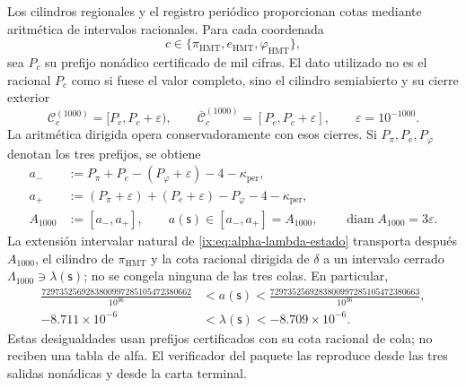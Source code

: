 Los cilindros regionales y el registro periódico proporcionan cotas mediante
aritmética de intervalos racionales. Para cada coordenada
\[
 c\in\{\pi_{\mathrm{HMT}},e_{\mathrm{HMT}},\varphi_{\mathrm{HMT}}\},
\]
sea \(P_c\) su prefijo nonádico certificado de mil cifras. El dato utilizado
no es el racional \(P_c\) como si fuese el valor completo, sino el cilindro
semiabierto y su cierre exterior
\[
 \mathcal C_c^{(1000)}=[P_c,P_c+\varepsilon),
 \qquad
 \overline{\mathcal C}_c^{(1000)}=[P_c,P_c+\varepsilon],
 \qquad \varepsilon=10^{-1000}.
\]
La aritmética dirigida opera conservadoramente con esos cierres. Si
\(P_\pi,P_e,P_\varphi\) denotan los tres prefijos, se obtiene
\begin{equation}
\begin{aligned}
 a_-&:=P_\pi+P_e-(P_\varphi+\varepsilon)-4-
       \kappa_{\mathrm{per}},\\
 a_+&:=(P_\pi+\varepsilon)+(P_e+\varepsilon)-P_\varphi-4-
       \kappa_{\mathrm{per}},\\
 A_{1000}&:=[a_-,a_+],
 \qquad a(\mathsf s)\in[a_-,a_+]=A_{1000},
 \qquad \operatorname{diam}A_{1000}=3\varepsilon.
\end{aligned}
\label{ix:eq:alpha-propagacion-colas-rev08}
\end{equation}
La extensión intervalar natural de
\eqref{ix:eq:alpha-lambda-estado} transporta después \(A_{1000}\), el cilindro
de \(\pi_{\mathrm{HMT}}\) y la cota racional dirigida de \(\delta\) a un
intervalo cerrado \(\Lambda_{1000}\ni\lambda(\mathsf s)\); no se congela
ninguna de las tres colas. En particular,
\begin{equation}
\begin{aligned}
 \frac{7297352569283800997285105472380662}{10^{36}}
 &<a(\mathsf s)<
 \frac{7297352569283800997285105472380663}{10^{36}},\\
 -8.711\mathbin{\times}10^{-6}
 &<\lambda(\mathsf s)<-8.709\mathbin{\times}10^{-6}.
\end{aligned}
 \label{ix:eq:alpha-cotas-precoordenada-lambda}
\end{equation}
Estas desigualdades usan prefijos certificados con su cota racional de
cola; no reciben una tabla de alfa. El verificador del paquete las reproduce
desde las tres salidas nonádicas y desde la carta terminal.

